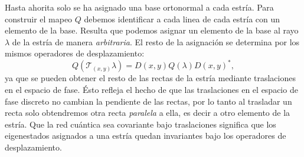 \documentclass[a4paper]{report}
\begin{document}
  Hasta ahorita solo se ha asignado una base ortonormal a
  cada estría. Para construir el mapeo $Q$ debemos
  identificar a cada linea de cada estría con un elemento de
  la base. Resulta que podemos asignar un elemento de la
  base al rayo $\lambda$ de la estría de manera
  \textit{arbitraria}.  El resto de la asignación se
  determina por los mismos operadores de desplazamiento:
  \[
    Q(\mathcal T_{(x,y)} \lambda)
    = D(x,y) Q(\lambda) D(x,y)^{*},
  \] 
  ya que se pueden obtener el resto de las rectas de la
  estría mediante traslaciones en el espacio de fase. Ésto
  refleja el hecho de que las traslaciones en el espacio
  de fase discreto no cambian la pendiente de las rectas,
  por lo tanto al trasladar un recta solo obtendremos otra
  recta \textit{paralela} a ella, es decir a otro elemento
  de la estría. Que la red cuántica sea covariante bajo
  traslaciones significa que los eigenestados asignados a
  una estría quedan invariantes bajo los operadores de
  desplazamiento. 
\end{document}
